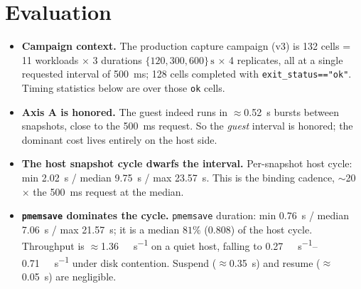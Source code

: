 \documentclass[conference]{IEEEtran}
\begin{document}
\section{Evaluation}
\label{sec:results}
\begin{itemize}
  \item \textbf{Campaign context.} The production capture campaign (v3) is
        132 cells = 11 workloads $\times$ 3 durations
        $\{120, 300, 600\}\,\si{\second}$ $\times$ 4 replicates, all at a
        single requested interval of \SI{500}{\milli\second}; 128 cells
        completed with \texttt{exit\_status=="ok"}. Timing statistics below
        are over those \texttt{ok} cells.
  \item \textbf{Axis A is honored.} The guest indeed runs in
        $\approx$\SI{0.52}{\second} bursts between snapshots, close to the
        \SI{500}{\milli\second} request. So the \emph{guest} interval is
        honored; the dominant cost lives entirely on the host side.
  \item \textbf{The host snapshot cycle dwarfs the interval.} Per-snapshot
        host cycle: min \SI{2.02}{\second} / median \SI{9.75}{\second} / max
        \SI{23.57}{\second}. This is the binding cadence, $\sim$20$\times$ the
        \SI{500}{\milli\second} request at the median.
  \item \textbf{\texttt{pmemsave} dominates the cycle.} \texttt{pmemsave}
        duration: min \SI{0.76}{\second} / median \SI{7.06}{\second} / max
        \SI{21.57}{\second}; it is a median $81\%$ ($0.808$) of the host
        cycle. Throughput is $\approx$\SI{1.36}{\gibi\byte\per\second} on a
        quiet host, falling to
        \SIrange{0.27}{0.71}{\gibi\byte\per\second} under disk contention.
        Suspend ($\approx$\SI{0.35}{\second}) and resume
        ($\approx$\SI{0.05}{\second}) are negligible.

\end{itemize}
\end{document}
